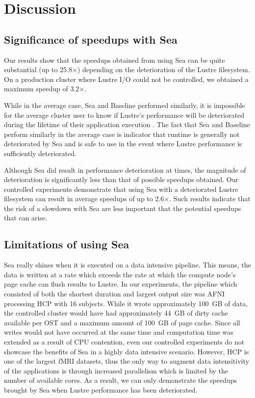     
    
    \section{Discussion}
    \subsection{Significance of speedups with Sea}

    Our results show that the speedups obtained from
    using Sea can be quite substantial (up to 25.8$\times$)
    depending on the deterioration of the Lustre
    filesystem. On a production cluster where Lustre I/O could not be controlled, we obtained a maximum speedup of 3.2$\times$.

    While in the average case, Sea and Baseline performed similarly, it is impossible for the
    average cluster user to know if Lustre's performance
    will be deteriorated during the lifetime of their
    application execution . The fact that Sea and Baseline perform similarly in the average case is indicator that runtime is generally not
    deteriorated by Sea and is safe to use in the event where Lustre performance is sufficiently deteriorated.

    Although Sea did result in performance deterioration at times, the
    magnitude of deterioration is significantly less than that of possible
    speedups obtained. Our controlled experiments demonstrate that using
    Sea with a deteriorated Lustre filesystem can result in average
    speedups of up to 2.6$\times$. Such results indicate that the risk of a
    slowdown with Sea are less important that the potential speedups that
    can arise.

    \subsection{Limitations of using Sea}
    
    Sea really shines when it is executed on a data intensive pipeline.
    This means, the data is written at a rate which exceeds the rate at
    which the compute node's page cache can flush results to Lustre. In
    our experiments, the pipeline which consisted of both the shortest
    duration and largest output size was AFNI processing HCP with 16 subjects.
    While it wrote approximately 100~GB of data, the controlled cluster would
    have had approximately 44~GB of dirty cache available per OST and a maximum
    amount of 100~GB of page cache. Since all writes would not have occurred at the same time
    and computation time was extended as a result of CPU contention, even our controlled experiments
    do not showcase the benefits of Sea in a highly data intensive scenario. However, HCP is one of the largest fMRI datasets, thus the only way to augment data intensitivity of the applications is through increased parallelism which is limited by the number of available cores. As a result, we can
    only demonstrate the speedups brought by Sea when Lustre performance has been deteriorated.


